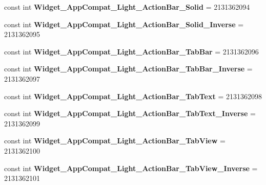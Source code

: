 \begin{DoxyCompactItemize}
const int {\bfseries Widget\+\_\+\+App\+Compat\+\_\+\+Light\+\_\+\+Action\+Bar\+\_\+\+Solid} = 2131362094
\item 
\mbox{\label{class_pinned_app_1_1_droid_1_1_resource_1_1_style_a050482f59e453cd3fc40a5ee9656ffff}} 
const int {\bfseries Widget\+\_\+\+App\+Compat\+\_\+\+Light\+\_\+\+Action\+Bar\+\_\+\+Solid\+\_\+\+Inverse} = 2131362095
\item 
\mbox{\label{class_pinned_app_1_1_droid_1_1_resource_1_1_style_a4b0bc4e7abb8072eb0b177d9b01c9cb9}} 
const int {\bfseries Widget\+\_\+\+App\+Compat\+\_\+\+Light\+\_\+\+Action\+Bar\+\_\+\+Tab\+Bar} = 2131362096
\item 
\mbox{\label{class_pinned_app_1_1_droid_1_1_resource_1_1_style_aaec5427c16a2c1801093920dba18d781}} 
const int {\bfseries Widget\+\_\+\+App\+Compat\+\_\+\+Light\+\_\+\+Action\+Bar\+\_\+\+Tab\+Bar\+\_\+\+Inverse} = 2131362097
\item 
\mbox{\label{class_pinned_app_1_1_droid_1_1_resource_1_1_style_a5d44c6fb3bdb20f55b73db49b121b14c}} 
const int {\bfseries Widget\+\_\+\+App\+Compat\+\_\+\+Light\+\_\+\+Action\+Bar\+\_\+\+Tab\+Text} = 2131362098
\item 
\mbox{\label{class_pinned_app_1_1_droid_1_1_resource_1_1_style_ac3b600a9d8fdd2a0f9704ffc31885541}} 
const int {\bfseries Widget\+\_\+\+App\+Compat\+\_\+\+Light\+\_\+\+Action\+Bar\+\_\+\+Tab\+Text\+\_\+\+Inverse} = 2131362099
\item 
\mbox{\label{class_pinned_app_1_1_droid_1_1_resource_1_1_style_a8292ef0127d56ab99b8c281389941a4d}} 
const int {\bfseries Widget\+\_\+\+App\+Compat\+\_\+\+Light\+\_\+\+Action\+Bar\+\_\+\+Tab\+View} = 2131362100
\item 
\mbox{\label{class_pinned_app_1_1_droid_1_1_resource_1_1_style_a14af2aa5ad4529b67f2c5915775c3e1c}} 
const int {\bfseries Widget\+\_\+\+App\+Compat\+\_\+\+Light\+\_\+\+Action\+Bar\+\_\+\+Tab\+View\+\_\+\+Inverse} = 2131362101

\end{DoxyCompactItemize}
